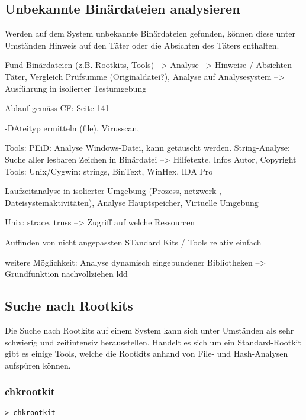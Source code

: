 


\subsection{Unbekannte Binärdateien analysieren}
Werden auf dem System unbekannte Binärdateien gefunden, können diese unter Umständen Hinweis auf den Täter oder die Absichten des Täters enthalten. 

Fund Binärdateien (z.B. Rootkits, Tools) --> Analyse --> Hinweise / Absichten Täter, Vergleich Prüfsumme (Originaldatei?), Analyse auf Analysesystem --> Ausführung in isolierter Testumgebung

Ablauf gemäss CF: Seite 141

-DAteityp ermitteln (file), Virusscan, 

Tools: PEiD: Analyse Windows-Datei, kann getäuscht werden.
String-Analyse: Suche aller lesbaren Zeichen in Binärdatei --> Hilfetexte, Infos Autor, Copyright
Tools: Unix/Cygwin: strings, BinText, WinHex, IDA Pro

Laufzeitanalyse in isolierter Umgebung (Prozess, netzwerk-, Dateisystemaktivitäten), Analyse Hauptspeicher, Virtuelle Umgebung

Unix: strace, truss --> Zugriff auf welche Ressourcen

Auffinden von nicht angepassten STandard Kits / Tools relativ einfach

weitere Möglichkeit: Analyse dynamisch eingebundener Bibliotheken --> Grundfunktion nachvollziehen
ldd



\subsection{Suche nach Rootkits}
Die Suche nach Rootkits auf einem System kann sich unter Umständen als sehr schwierig und zeitintensiv herausstellen. Handelt es sich um ein Standard-Rootkit gibt es einige Tools, welche die Rootkits anhand von File- und Hash-Analysen aufspüren können. 


\subsubsection{chkrootkit} 
\begin{lstlisting}
> chkrootkit
\end{lstlisting}



